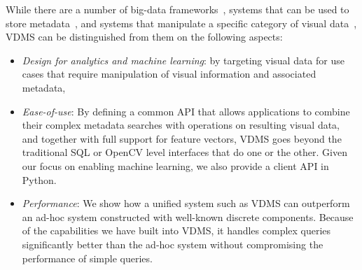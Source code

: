 While there are a number of big-data frameworks~\cite{spark, hadoop}, systems
that can be used to store metadata~\cite{memsql, vertica}, and systems that
manipulate a specific category of visual data~\cite{scidb, rasdaman}, VDMS can
be distinguished from them on the following aspects:

\begin{itemize}
\item {\em Design for analytics and machine learning}: by targeting
visual data for use cases that require manipulation
of visual information and associated metadata,
\item {\em Ease-of-use}: By defining a common API that allows applications to
combine their complex metadata searches with operations on resulting visual
data, and together with full support for feature vectors, VDMS goes beyond the
traditional SQL or OpenCV level interfaces that do one or the other. Given our
focus on enabling machine learning, we also provide a client API in Python.
\item {\em Performance}: We show how a unified system such as VDMS can
outperform an ad-hoc system constructed with well-known discrete components.
Because of the capabilities we have built into VDMS, it handles complex
queries significantly better than the ad-hoc system without compromising the
performance of simple queries.
\end{itemize}
